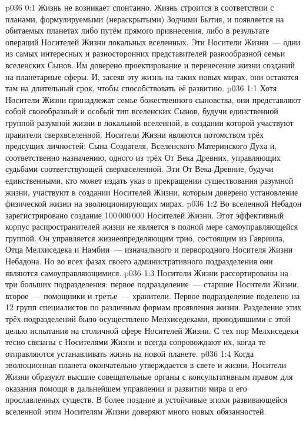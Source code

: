 \author{Сын Ворондадек}
\vs p036 0:1 Жизнь не возникает спонтанно. Жизнь строится в соответствии с планами, формулируемыми (нераскрытыми) Зодчими Бытия, и появляется на обитаемых планетах либо путём прямого привнесения, либо в результате операций Носителей Жизни локальных вселенных. Эти Носители Жизни~--- одни из самых интересных и разносторонних представителей разнообразной семьи вселенских Сынов. Им доверено проектирование и перенесение жизни созданий на планетарные сферы. И, засеяв эту жизнь на таких новых мирах, они остаются там на длительный срок, чтобы способствовать её развитию.
\vs p036 1:1 Хотя Носители Жизни принадлежат семье божественного сыновства, они представляют собой своеобразный и особый тип вселенских Сынов, будучи единственной группой разумной жизни в локальной вселенной, в создании которой участвуют правители сверхвселенной. Носители Жизни являются потомством трёх предсущих личностей: Сына Создателя, Вселенского Материнского Духа и, соответственно назначению, одного из трёх От Века Древних, управляющих судьбами соответствующей сверхвселенной. Эти От Века Древние, будучи единственными, кто может издать указ о прекращении существования разумной жизни, участвуют в создании Носителей Жизни, которым доверено установление физической жизни на эволюционирующих мирах.
\vs p036 1:2 Во вселенной Небадон зарегистрировано создание 100\,000\,000 Носителей Жизни. Этот эффективный корпус распространителей жизни не является в полной мере самоуправляющейся группой. Он управляется жизнеопределяющим трио, состоящим из Гавриила, Отца Мелхиседека и Намбии~--- изначального и первородного Носителя Жизни Небадона. Но во всех фазах своего административного подразделения они являются самоуправляющимися.
\vs p036 1:3 Носители Жизни рассортированы на три больших подразделения: первое подразделение~--- старшие Носители Жизни, второе~--- помощники и третье~--- хранители. Первое подразделение поделено на 12 групп специалистов по различным формам проявления жизни. Разделение этих трёх подразделений было осуществлено Мелхиседеками, проводившими с этой целью испытания на столичной сфере Носителей Жизни. С тех пор Мелхиседеки тесно связаны с Носителями Жизни и всегда сопровождают их, когда те отправляются устанавливать жизнь на новой планете.
\vs p036 1:4 Когда эволюционная планета окончательно утверждается в свете и жизни, Носители Жизни образуют высшие совещательные органы с консультативным правом для оказания помощи в дальнейшем управлении и развитии мира и его прославленных существ. В более поздние и устойчивые эпохи развивающейся вселенной этим Носителям Жизни доверяют много новых обязанностей.
